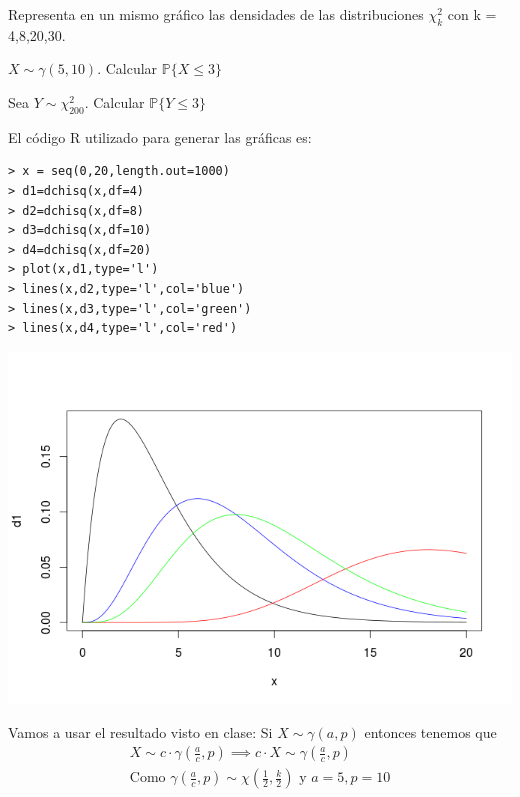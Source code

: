 \begin{problem}[3]

\ppart Representa en un mismo gráfico las densidades de las distribuciones $\chi^2_k $ con k = 4,8,20,30.

\ppart $X \sim \gamma(5,10)$. Calcular $\mathbb{P}\{X\leq 3\}$

\ppart Sea $Y \sim \chi_{200}^2$. Calcular $\mathbb{P}\{Y\leq 3\}$

\solution
\spart
El código R utilizado para generar las gráficas es:

\begin{verbatim}
> x = seq(0,20,length.out=1000)
> d1=dchisq(x,df=4)
> d2=dchisq(x,df=8)
> d3=dchisq(x,df=10)
> d4=dchisq(x,df=20)
> plot(x,d1,type='l')
> lines(x,d2,type='l',col='blue')
> lines(x,d3,type='l',col='green')
> lines(x,d4,type='l',col='red')
\end{verbatim}

\begin{center}
\includegraphics[width=1\textwidth]{img/Chicuadrado.png}
\label{Ejercicio 4}
\end{center}

\spart
Vamos a usar el resultado visto en clase:
Si $X\sim \gamma(a,p)$ entonces tenemos que 
\begin{gather*}
X \sim c \cdot \gamma(\frac{a}{c}, p) \implies
c \cdot X \sim \gamma(\frac{a}{c}, p)\\
\text{Como } \gamma \left( \frac{a}{c}, p \right) \sim \chi \left( \frac{1}{2}, \frac{k}{2} \right) \text{ y } a = 5, p = 10
\end{gather*}


\end{problem}
